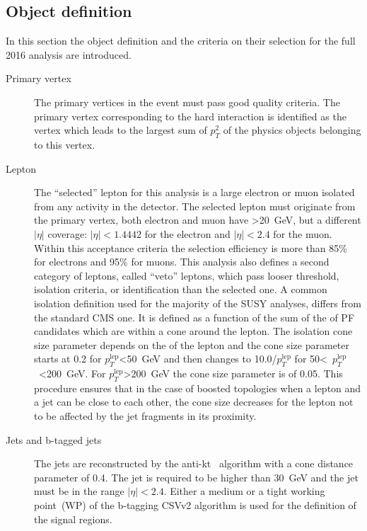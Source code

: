 
\subsection{Object definition~\label{sec:objects}}


In this section the object definition and the criteria on their selection for the full 2016 analysis are introduced.

\begin{description}
\item[Primary vertex]
The primary vertices in the event must pass good quality criteria. The primary vertex corresponding to the hard interaction is identified as the vertex which leads to the largest sum of $p_{T}^{2}$ of the physics objects belonging to this vertex.

\item[Lepton]
The ``selected'' lepton for this analysis is a large \pt electron or muon isolated from any activity in the detector. The selected lepton must originate from the primary vertex, both electron and muon have \pt>20~GeV, but a different $|\eta|$ coverage: $|\eta|<1.4442$ for the electron and $|\eta|<2.4$ for the muon. Within this acceptance criteria the selection efficiency is more than 85\% for electrons and 95\% for muons. This analysis also defines a second category of leptons, called ``veto'' leptons, which pass looser  \pt threshold, isolation criteria, or identification than the selected one. A common isolation definition used for the majority of the SUSY analyses, differs from the standard CMS one. It is defined as a function of the sum of the \pt of PF candidates which are within a cone around the lepton. The isolation cone size parameter depends on the \pt of the lepton and the cone size parameter  starts at 0.2 for $p_{T}^{\mathrm{lep}}$<50~GeV and then changes to 10.0/$p_{T}^{\mathrm{lep}}$ for  50<~$p_{T}^{\mathrm{lep}}$~<200~GeV. For $p_{T}^{\mathrm{lep}}$>200~GeV the cone size parameter is of 0.05. This procedure ensures that in the case of boosted topologies when a lepton and a jet can be close to each other, the cone size decreases for the lepton  not to be affected by the jet fragments in its proximity.   

\item[Jets and b-tagged jets]
The jets are reconstructed by the anti-kt~\cite{Cacciari:2008gp} algorithm with a cone distance parameter of 0.4. The jet \pt is required to be higher than 30~GeV and the jet must be in the range $|\eta|<2.4$. Either a medium or a tight working point~(WP) of the b-tagging CSVv2 algorithm is used for the definition of the signal regions.  


\end{description}
